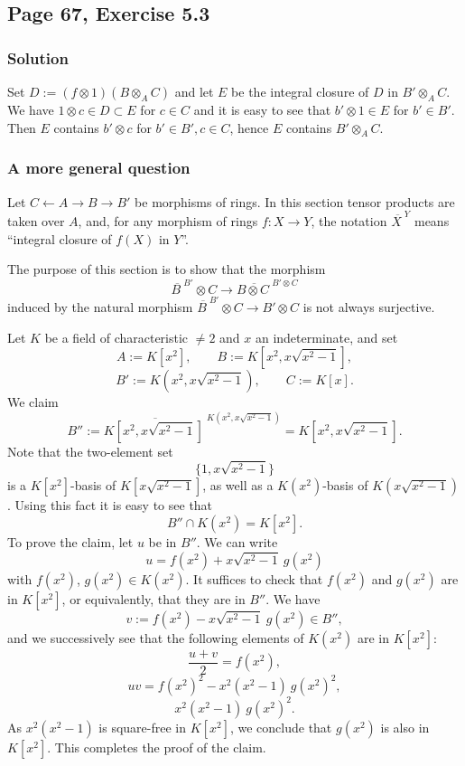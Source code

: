 \documentclass[parskip=half,fontsize=12pt]{scrartcl}%
\begin{document}
\subsection{Page 67, Exercise 5.3}%

\subsubsection{Solution}

Set $D:=(f\otimes1)(B\otimes_AC)$ and let $E$ be the integral closure of $D$ in $B'\otimes_AC$. We have $1\otimes c\in D\subset E$ for $c\in C$ and it is easy to see that $b'\otimes1\in E$ for $b'\in B'$. Then $E$ contains $b'\otimes c$ for $b'\in B',c\in C$, hence $E$ contains $B'\otimes_AC$.

\subsubsection{A more general question}%

Let $C\leftarrow A\to B\to B'$ be morphisms of rings. In this section tensor products are taken over $A$, and, for any morphism of rings $f:X\to Y$, the notation $\overline{X\ }^Y$ means ``integral closure of $f(X)$ in $Y$''. 

The purpose of this section is to show that the morphism 
$$
\overline{B\ }^{B'}\otimes C\to\overline{B\otimes C\ }^{B'\otimes C}
$$ 
induced by the natural morphism $\overline{B\ }^{B'}\otimes C\to B'\otimes C$ is not always surjective. 

Let $K$ be a field of characteristic $\ne2$ and $x$ an indeterminate, and set 
$$
A:=K[x^2],\qquad B:=K\left[x^2,x\sqrt{x^2-1}\right],
$$
$$
B':=K\left(x^2,x\sqrt{x^2-1}\right),\qquad C:=K[x].
$$ 
We claim 
$$
B'':=\overline{K\left[x^2,x\sqrt{x^2-1}\right]\ }^{K\left(x^2,x\sqrt{x^2-1}\right)}=K\left[x^2,x\sqrt{x^2-1}\right].
$$ 
Note that the two-element set 
$$
\{1,x\sqrt{x^2-1}\}
$$ 
is a $K[x^2]$-basis of $K[x\sqrt{x^2-1}]$, as well as a $K(x^2)$-basis of $K(x\sqrt{x^2-1})$. Using this fact it is easy to see that 
$$
B''\cap K(x^2)=K[x^2].
$$ 
To prove the claim, let $u$ be in $B''$. We can write 
$$
u=f(x^2)+x\sqrt{x^2-1}\ g(x^2)
$$ 
with $f(x^2)$, $g(x^2)\in K(x^2)$. It suffices to check that $f(x^2)$ and $g(x^2)$ are in $K[x^2]$, or equivalently, that they are in $B''$. We have 
$$
v:=f(x^2)-x\sqrt{x^2-1}\ g(x^2)\in B'',
$$ 
and we successively see that the following elements of $K(x^2)$ are in $K[x^2]$: 
$$
\frac{u+v}2=f(x^2),
$$ 
$$
uv=f(x^2)^2-x^2(x^2-1)\ g(x^2)^2,
$$ 
$$
x^2(x^2-1)\ g(x^2)^2.
$$ 
As $x^2(x^2-1)$ is square-free in $K[x^2]$, we conclude that $g(x^2)$ is also in $K[x^2]$. This completes the proof of the claim. 
\end{document}
